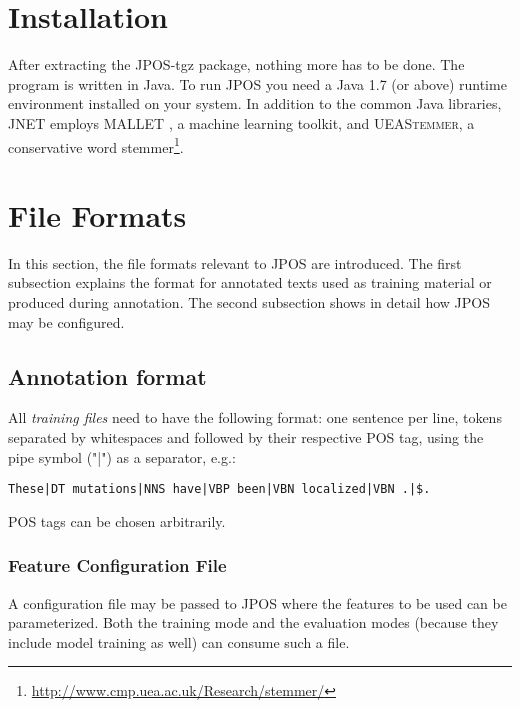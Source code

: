 \documentclass[11pt,a4paper,halfparskip]{scrartcl}
\begin{document}
\section{Installation}
After extracting the JPOS-tgz package, nothing more has to be done.
The program is written in Java. To run JPOS you need a Java 1.7 (or
above) runtime environment installed on your system. In addition to
the common Java libraries, JNET employs \textsc{MALLET}
\cite{McCallum2002}, a machine learning toolkit, and
\textsc{UEAStemmer}, a conservative word
stemmer\footnote{\url{http://www.cmp.uea.ac.uk/Research/stemmer/}}.

\section{File Formats}
\label{sec_formats}
In this section, the file formats relevant to JPOS are introduced. The
first subsection explains the format for annotated texts used as training material or produced during annotation. The second subsection shows in detail how JPOS may be configured.


\subsection{Annotation format}
\label{ssec_formatconverter}
All \textit{training files} need to have the following format: one
sentence per line, tokens separated by whitespaces and followed by their respective POS tag, using the pipe symbol ("|") as a separator, e.g.:

\begin{verbatim}
These|DT mutations|NNS have|VBP been|VBN localized|VBN .|$.
\end{verbatim}

POS tags can be chosen arbitrarily.

\subsubsection{Feature Configuration File}
\label{ssec_featconfig}

A configuration file may be passed to JPOS where the features to be
used can be parameterized. Both the training mode and the evaluation
modes (because they include model training as well) can consume such a
file.
\end{document}
